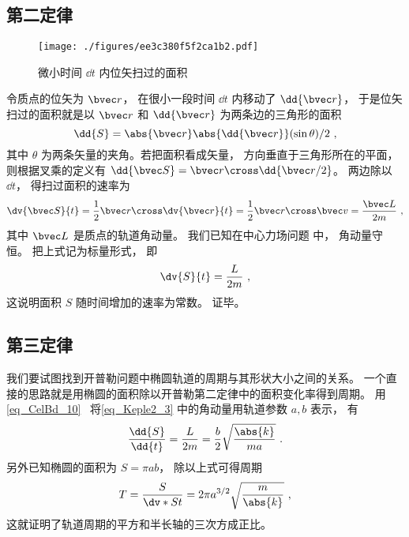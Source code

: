 

\subsection{第二定律}
\begin{figure}[ht]
\centering
\texttt{[image: ./figures/ee3c380f5f2ca1b2.pdf]}
\caption{微小时间 $\dd{t}$ 内位矢扫过的面积} \label{fig_Keple2_1}
\end{figure}

令质点的位矢为 $\bvec r$，  在很小一段时间 $\dd{t}$ 内移动了 $\dd{\bvec r}$，  于是位矢扫过的面积就是以 $\bvec r$ 和 $\dd{\bvec r}$ 为两条边的三角形的面积
\begin{equation}
\dd{S} = \abs{\bvec r} \abs{\dd{\bvec r}} (\sin \theta) /2~,
\end{equation}
其中 $\theta$ 为两条矢量的夹角。若把面积看成矢量， 方向垂直于三角形所在的平面， 则根据叉乘的定义有 $\dd{\bvec S} = \bvec r \cross \dd{\bvec r/2}$。 两边除以 $\dd{t}$，  得扫过面积的速率为
\begin{equation}
\dv{\bvec S}{t} = \frac12 \bvec r \cross \dv{\bvec r}{t} = \frac12 \bvec r\cross \bvec v = \frac{\bvec L}{2m}~,
\end{equation}
其中 $\bvec L$ 是质点的轨道角动量。 我们已知在中心力场问题 中， 角动量守恒。 把上式记为标量形式， 即
\begin{equation}\label{eq_Keple2_3}
\dv{S}{t} = \frac{L}{2m}~,
\end{equation}
这说明面积 $S$ 随时间增加的速率为常数。 证毕。

\subsection{第三定律}
我们要试图找到开普勒问题中椭圆轨道的周期与其形状大小之间的关系。 一个直接的思路就是用椭圆的面积除以开普勒第二定律中的面积变化率得到周期。 用\autoref{eq_CelBd_10}~ 将\autoref{eq_Keple2_3} 中的角动量用轨道参数 $a,b$ 表示， 有
\begin{equation}
\frac{\dd{S}}{\dd{t}} = \frac{L}{2m} = \frac b2 \sqrt{\frac{\abs{k}}{ma}}~.
\end{equation}
另外已知椭圆的面积为 $S = \pi ab$， 除以上式可得周期
\begin{equation}\label{eq_Keple2_1}
T = \frac{S}{\dv*{S}{t}} = 2\pi a^{3/2} \sqrt{\frac{m}{\abs{k}}}~,
\end{equation}
这就证明了轨道周期的平方和半长轴的三次方成正比。